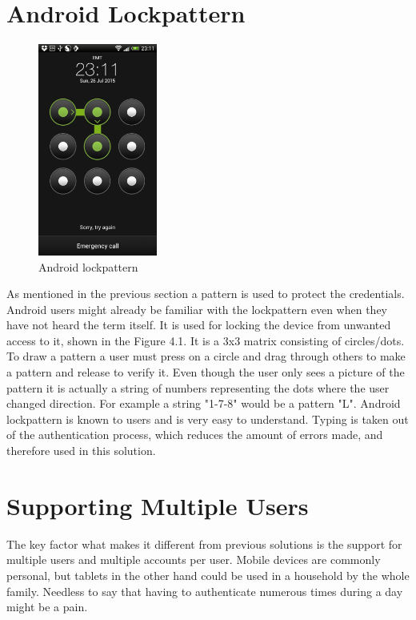 \section{Android Lockpattern}
\begin{figure} 
\begin{center} 
\includegraphics[width=0.35\textwidth]{images/lockpattern.png} \caption{Android lockpattern} \label{fig:android lockpattern} 
\end{center}
\end{figure}
As mentioned in the previous section a pattern is used to protect the credentials. Android users might already be familiar with the lockpattern even when they have not heard the term itself. It is used for locking the device from unwanted access to it, shown in the Figure 4.1. It is a 3x3 matrix consisting of circles/dots. To draw a pattern a user must press on a circle and drag through others to make a pattern and release to verify it. Even though the user only sees a picture of the pattern it is actually a string of numbers representing the dots where the user changed direction. For example a string "1-7-8" would be a pattern "L". 
Android lockpattern is known to users and is very easy to understand. Typing is taken out of the authentication process, which reduces the amount of errors made, and therefore used in this solution.

\section{Supporting Multiple Users}
The key factor what makes it different from previous solutions is the support for multiple users and multiple accounts per user. Mobile devices are commonly personal, but tablets in the other hand could be used in a household by the whole family. Needless to say that having to authenticate numerous times during a day might be a pain. 

